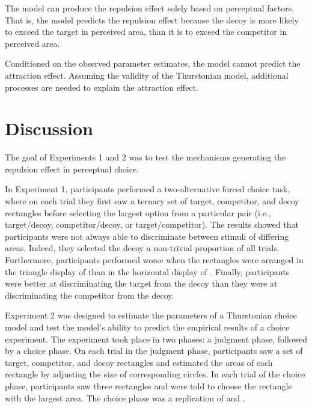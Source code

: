 The model can produce the repulsion effect solely based on perceptual factors. That is, the model predicts the repulsion effect because the decoy is more likely to exceed the target in perceived area, than it is to exceed the competitor in perceived area.

Conditioned on the observed parameter estimates, the model cannot predict the attraction effect. Assuming the validity of the Thurstonian model, additional processes are needed to explain the attraction effect.

\section{Discussion}

The goal of Experiments 1 and 2 was to test the mechanisms generating the repulsion effect in perceptual choice. 

In Experiment 1, participants performed a two-alternative forced choice task, where on each trial they first saw a ternary set of target, competitor, and decoy rectangles before selecting the largest option from a particular pair (i.e., target/decoy, competitor/decoy, or target/competitor). The results showed that participants were not always able to discriminate between stimuli of differing areas. Indeed, they selected the decoy a non-trivial proportion of all trials. Furthermore, participants performed worse when the rectangles were arranged in the triangle display of \textcite{spektorWhenGoodLooks2018b} than in the horizontal display of \textcite{trueblood2013not}. Finally, participants were better at discriminating the target from the decoy than they were at discriminating the competitor from the decoy.

Experiment 2 was designed to estimate the parameters of a Thurstonian choice model and test the model's ability to predict the empirical results of a choice experiment. The experiment took place in two phases: a judgment phase, followed by a choice phase. On each trial in the judgment phase, participants saw a set of target, competitor, and decoy rectangles and estimated the areas of each rectangle by adjusting the size of corresponding circles. In each trial of the choice phase, participants saw three rectangles and were told to choose the rectangle with the largest area. The choice phase was a replication of \textcite{trueblood2013not} and \textcite{spektorWhenGoodLooks2018b}. 

